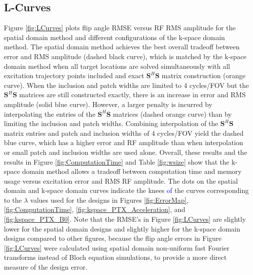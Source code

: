 \subsection*{L-Curves}
Figure \ref{fig:LCurves} plots flip angle RMSE versus RF RMS amplitude for the spatial domain method
and different configurations of the k-space domain method.
The spatial domain method achieves the best overall tradeoff between error and RMS amplitude (dashed black curve),
which is matched by the k-space domain method when all target locations are solved simultaneously with
all excitation trajectory points included and exact $\bm{S}^H\bm{S}$ matrix construction (orange curve). 
When the inclusion and patch widths are limited to 4 cycles/FOV but the $\bm{S}^H\bm{S}$ 
matrices are still constructed exactly, there is an increase in error and RMS amplitude (solid blue curve). 
However, a larger penalty is incurred by interpolating the entries of the $\bm{S}^H\bm{S}$ matrices (dashed orange curve)
than by limiting the inclusion and patch widths.
Combining interpolation of the $\bm{S}^H\bm{S}$ matrix entries and patch and inclusion widths of 4 cycles/FOV yield 
the dashed blue curve, which has a higher error and RF amplitude than when interpolation or small patch and inclusion widths are
used alone.
Overall, these results and the results in Figure \ref{fig:ComputationTime} and Table \ref{fig:wsize}
show that the k-space domain method allows a tradeoff between computation time and memory usage versus
excitation error and RMS RF amplitude.
The dots on the spatial domain and k-space domain curves indicate the knees \textcolor{blue}{of} the curves corresponding to
the $\lambda$ values used for the designs in Figures \ref{fig:ErrorMap}, \ref{fig:ComputationTime}, \ref{fig:kspace_PTX_Acceleration}, and \ref{fig:kspace_PTX_B0}.
Note that the RMSE's in Figure \ref{fig:LCurves} are slightly lower for the spatial domain designs
and slightly higher for the k-space domain designs compared to other figures,
because the flip angle errors in Figure \ref{fig:LCurves} were calculated using 
spatial domain non-uniform fast Fourier transforms instead of Bloch equation simulations, 
to provide a more direct measure of the design error. 




